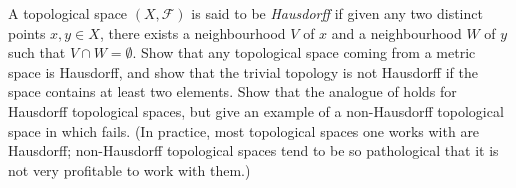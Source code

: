 \begin{ex}\label{ii:ex:2.5.4}
  A topological space \((X, \mathcal{F})\) is said to be \emph{Hausdorff} if given any two distinct points \(x, y \in X\), there exists a neighbourhood \(V\) of \(x\) and a neighbourhood \(W\) of \(y\) such that \(V \cap W = \emptyset\).
  Show that any topological space coming from a metric space is Hausdorff, and show that the trivial topology is not Hausdorff if the space contains at least two elements.
  Show that the analogue of  holds for Hausdorff topological spaces, but give an example of a non-Hausdorff topological space in which  fails.
  (In practice, most topological spaces one works with are Hausdorff;
  non-Hausdorff topological spaces tend to be so pathological that it is not very profitable to work with them.)
\end{ex}

